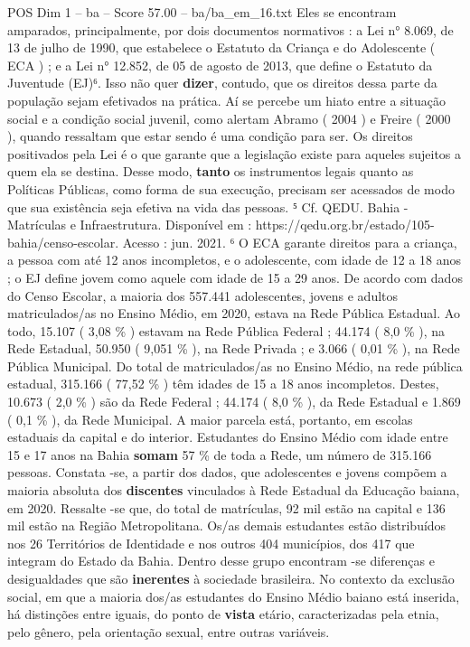 \begin{textsample}{POS Dim 1 – ba – Score 57.00 – ba/ba\_em\_16.txt}
Eles se encontram amparados, principalmente, por dois documentos normativos : a Lei n{\EmojiFont °} 8.069, de 13 de julho de 1990, que estabelece o Estatuto da Criança e do Adolescente ( ECA ) ; e a Lei n{\EmojiFont °} 12.852, de 05 de agosto de 2013, que define o Estatuto da Juventude (EJ)⁶.
Isso não quer \textbf{dizer}, contudo, que os direitos dessa parte da população sejam efetivados na prática.
Aí se percebe um hiato entre a situação social e a condição social juvenil, como alertam Abramo ( 2004 ) e Freire ( 2000 ), quando ressaltam que estar sendo é uma condição para ser.
Os direitos positivados pela Lei é o que garante que a legislação existe para aqueles sujeitos a quem ela se destina.
Desse modo, \textbf{tanto} os instrumentos legais quanto as Políticas Públicas, como forma de sua execução, precisam ser acessados de modo que sua existência seja efetiva na vida das pessoas. ⁵ Cf.
QEDU.
Bahia - Matrículas e Infraestrutura.
Disponível em : https://qedu.org.br/estado/105-bahia/censo-escolar.
Acesso : jun. 2021. ⁶ O ECA garante direitos para a criança, a pessoa com até 12 anos incompletos, e o adolescente, com idade de 12 a 18 anos ; o EJ define jovem como aquele com idade de 15 a 29 anos.
De acordo com dados do Censo Escolar, a maioria dos 557.441 adolescentes, jovens e adultos matriculados/as no Ensino Médio, em 2020, estava na Rede Pública Estadual.
Ao todo, 15.107 ( 3,08 \% ) estavam na Rede Pública Federal ; 44.174 ( 8,0 \% ), na Rede Estadual, 50.950 ( 9,051 \% ), na Rede Privada ; e 3.066 ( 0,01 \% ), na Rede Pública Municipal.
Do total de matriculados/as no Ensino Médio, na rede pública estadual, 315.166 ( 77,52 \% ) têm idades de 15 a 18 anos incompletos.
Destes, 10.673 ( 2,0 \% ) são da Rede Federal ; 44.174 ( 8,0 \% ), da Rede Estadual e 1.869 ( 0,1 \% ), da Rede Municipal.
A maior parcela está, portanto, em escolas estaduais da capital e do interior.
Estudantes do Ensino Médio com idade entre 15 e 17 anos na Bahia \textbf{somam} 57 \% de toda a Rede, um número de 315.166 pessoas.
Constata -se, a partir dos dados, que adolescentes e jovens compõem a maioria absoluta dos \textbf{discentes} vinculados à Rede Estadual da Educação baiana, em 2020.
Ressalte -se que, do total de matrículas, 92 mil estão na capital e 136 mil estão na Região Metropolitana.
Os/as demais estudantes estão distribuídos nos 26 Territórios de Identidade e nos outros 404 municípios, dos 417 que integram do Estado da Bahia.
Dentro desse grupo encontram -se diferenças e desigualdades que são \textbf{inerentes} à sociedade brasileira.
No contexto da exclusão social, em que a maioria dos/as estudantes do Ensino Médio baiano está inserida, há distinções entre iguais, do ponto de \textbf{vista} etário, caracterizadas pela etnia, pelo gênero, pela orientação sexual, entre outras variáveis.

\end{textsample}
